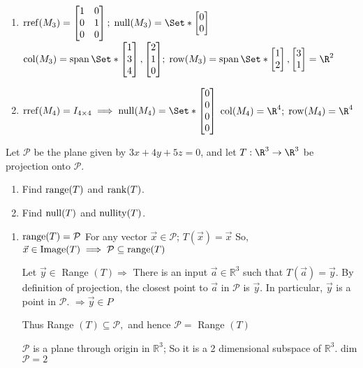 \begin{exercises}
\begin{problist}
\begin{solution}
\begin{enumerate}
				\item $\rref(M_{3})=\mat{1&0\\0&1\\0&0};\; \Null(M_{3})=\Set*{\mat{0\\0}}$
					$\Col(M_{3})=\Span\Set*{\mat{1\\3\\4},\mat{2\\1\\0}};\;
					\Row(M_{3})=\Span\Set*{\mat{1\\2},\mat{3\\1}}=\R^{2}$

				\item $\rref(M_{4})=I_{4\times4}\implies \Null(M_{4})=\Set*{\mat{0\\0\\0\\0}}$
					$\Col(M_{4})=\R^{4}; \; \Row(M_{4})=\R^{4}$
			\end{enumerate}
		\end{solution}

		\prob Let $\mathcal P$ be the plane given by $3x+4y+5z=0$, and let $T:\R^{3}\to\R^{3}$
		be projection onto $\mathcal P$.
		\begin{enumerate}
			\item Find $\operatorname{range}(T)$ and $\operatorname{rank}(T)$.

			\item Find $\operatorname{null}(T)$ and $\operatorname{nullity}(T)$.
		\end{enumerate}


		\begin{solution}

			\begin{enumerate}
				\item $\operatorname{range}(T)=\mathcal{P}$ For any vector $\vec x \in
					\mathcal{P}$; $T(\vec x) = \vec x$ So,
					$\vec x\in \text{Image}(T) \implies \mathcal{P}\subseteq
					\operatorname{range}(T)$

					Let $\vec{y}\in$ Range $(T) \Rightarrow$ There is
					an input $\vec{a}\in \mathbb{R}^{3}$ such that
					$T(\vec{a})=\vec{y}$. By definition of projection,
					the closest point to $\vec{a}$ in $\mathcal{P}$ is
					$\vec{y}$. In particular, $\vec{y}$ is a point in
					$\mathcal{P}$. $\Rightarrow \vec{y}\in P$

					Thus Range $(T) \subseteq \mathcal{P},$ and hence $\mathcal{P}=$
					Range $(T)$

					$\mathcal{P}$ is a plane through origin in $\mathbb{R}^{3}$;
					So it is a 2 dimensional subspace of
					$\mathbb{R}^{3}$. dim $\mathcal{P}=2$


\end{enumerate}
\end{solution}
\end{problist}
\end{exercises}
